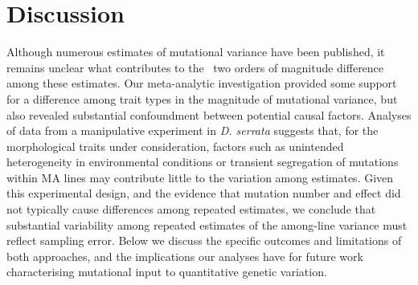 \section{Discussion}
Although numerous estimates of mutational variance have been published, it remains unclear what contributes to the ~two orders of magnitude difference among these estimates. Our meta-analytic investigation provided some support for a difference among trait types in the magnitude of mutational variance, but also revealed substantial confoundment between potential causal factors. Analyses of data from a manipulative experiment in \textit{D. serrata} suggests that, for the morphological traits under consideration, factors such as unintended heterogeneity in environmental conditions or transient segregation of mutations within MA lines may contribute little to the variation among estimates. Given this experimental design, and the evidence that mutation number and effect did not typically cause differences among repeated estimates, we conclude that substantial variability among repeated estimates of the among-line variance must reflect sampling error. Below we discuss the specific outcomes and limitations of both approaches, and the implications our analyses have for future work characterising mutational input to quantitative genetic variation.\par

